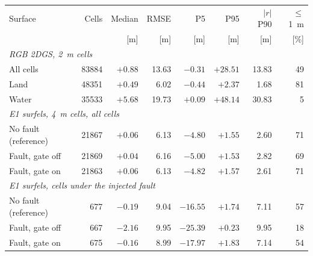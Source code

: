 \begin{tabular}{lrrrrrrr}
\toprule
Surface & Cells & Median & RMSE & P5 & P95 & $|r|$ P90 & $\le$1~m \\
 & & [m] & [m] & [m] & [m] & [m] & [\%] \\
\midrule
\multicolumn{8}{l}{\emph{RGB 2DGS, 2~m cells}} \\
All cells & 83884 & $+0.88$ & 13.63 & $-0.31$ & $+28.51$ & 13.83 & 49 \\
Land & 48351 & $+0.49$ & 6.02 & $-0.44$ & $+2.37$ & 1.68 & 81 \\
Water & 35533 & $+5.68$ & 19.73 & $+0.09$ & $+48.14$ & 30.83 & 5 \\
\midrule
\multicolumn{8}{l}{\emph{E1 surfels, 4~m cells, all cells}} \\
No fault (reference) & 21867 & $+0.06$ & 6.13 & $-4.80$ & $+1.55$ & 2.60 & 71 \\
Fault, gate off & 21869 & $+0.04$ & 6.16 & $-5.00$ & $+1.53$ & 2.82 & 69 \\
Fault, gate on & 21863 & $+0.06$ & 6.13 & $-4.82$ & $+1.57$ & 2.61 & 71 \\
\midrule
\multicolumn{8}{l}{\emph{E1 surfels, cells under the injected fault}} \\
No fault (reference) & 677 & $-0.19$ & 9.04 & $-16.55$ & $+1.74$ & 7.11 & 57 \\
Fault, gate off & 667 & $-2.16$ & 9.95 & $-25.39$ & $+0.23$ & 9.95 & 18 \\
Fault, gate on & 675 & $-0.16$ & 8.99 & $-17.97$ & $+1.83$ & 7.14 & 54 \\
\bottomrule
\end{tabular}
